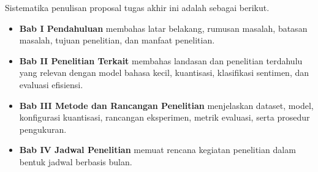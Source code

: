 Sistematika penulisan proposal tugas akhir ini adalah sebagai berikut.

\begin{itemize}
  \item \textbf{Bab I Pendahuluan} membahas latar belakang, rumusan masalah, batasan masalah, tujuan penelitian, dan manfaat penelitian.
  \item \textbf{Bab II Penelitian Terkait} membahas landasan dan penelitian terdahulu yang relevan dengan model bahasa kecil, kuantisasi, klasifikasi sentimen, dan evaluasi efisiensi.
  \item \textbf{Bab III Metode dan Rancangan Penelitian} menjelaskan dataset, model, konfigurasi kuantisasi, rancangan eksperimen, metrik evaluasi, serta prosedur pengukuran.
  \item \textbf{Bab IV Jadwal Penelitian} memuat rencana kegiatan penelitian dalam bentuk jadwal berbasis bulan.
\end{itemize}
